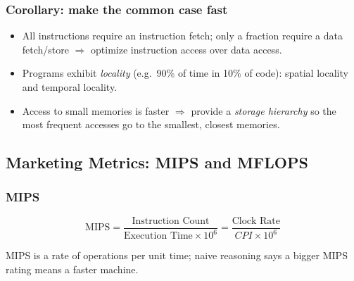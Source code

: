 \subsubsection{Corollary: make the common case fast}
\begin{itemize}
  \item All instructions require an instruction fetch; only a fraction
  require a data fetch/store $\Rightarrow$ optimize instruction access over
  data access.
  \item Programs exhibit \emph{locality} (e.g.\ 90\% of time in 10\% of
  code): spatial locality and temporal locality.
  \item Access to small memories is faster $\Rightarrow$ provide a
  \emph{storage hierarchy} so the most frequent accesses go to the
  smallest, closest memories.
\end{itemize}
\begin{center}
\end{center}

\subsection{Marketing Metrics: MIPS and MFLOPS}

\subsubsection{MIPS}
\begin{definition}
\[
  \text{MIPS} = \frac{\text{Instruction Count}}{\text{Execution Time}
  \times 10^6} = \frac{\text{Clock Rate}}{CPI \times 10^6}
\]
\end{definition}
MIPS is a rate of operations per unit time; naive reasoning says a bigger
MIPS rating means a faster machine.

